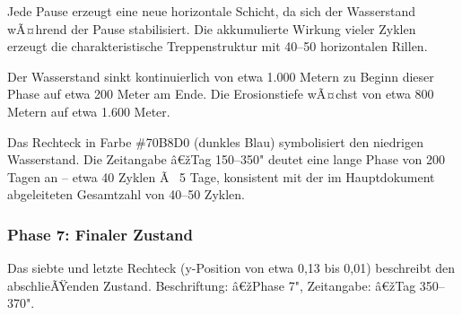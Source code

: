Jede Pause erzeugt eine neue horizontale Schicht, da sich der Wasserstand wÃ¤hrend der Pause stabilisiert. Die akkumulierte Wirkung vieler Zyklen erzeugt die charakteristische Treppenstruktur mit 40--50 horizontalen Rillen.

Der Wasserstand sinkt kontinuierlich von etwa 1.000 Metern zu Beginn dieser Phase auf etwa 200 Meter am Ende. Die Erosionstiefe wÃ¤chst von etwa 800 Metern auf etwa 1.600 Meter.

Das Rechteck in Farbe \#70B8D0 (dunkles Blau) symbolisiert den niedrigen Wasserstand. Die Zeitangabe â€žTag 150--350" deutet eine lange Phase von 200 Tagen an -- etwa 40 Zyklen Ã  5 Tage, konsistent mit der im Hauptdokument abgeleiteten Gesamtzahl von 40--50 Zyklen.

\subsubsection*{Phase 7: Finaler Zustand}

Das siebte und letzte Rechteck (y-Position von etwa 0,13 bis 0,01) beschreibt den abschlieÃŸenden Zustand. Beschriftung: â€žPhase 7", Zeitangabe: â€žTag 350--370".


